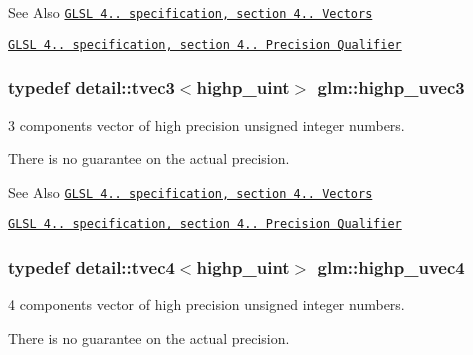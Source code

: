 \begin{DoxySeeAlso}{See Also}
\href{http://www.opengl.org/registry/doc/GLSLangSpec.4.20.8.pdf}{\tt G\-L\-S\-L 4.. specification, section 4.. Vectors} 

\href{http://www.opengl.org/registry/doc/GLSLangSpec.4.20.8.pdf}{\tt G\-L\-S\-L 4.. specification, section 4.. Precision Qualifier} 
\end{DoxySeeAlso}
\hypertarget{group__core__precision_gade4b43d968dd42ee3215a51de7b86425}{
\subsubsection[{highp\-\_\-uvec3}]{\setlength{\rightskip}{0pt plus 5cm}typedef detail\-::tvec3$<$highp\-\_\-uint$>$ {\bf glm\-::highp\-\_\-uvec3}}}\label{group__core__precision_gade4b43d968dd42ee3215a51de7b86425}


3 components vector of high precision unsigned integer numbers. 

There is no guarantee on the actual precision.

\begin{DoxySeeAlso}{See Also}
\href{http://www.opengl.org/registry/doc/GLSLangSpec.4.20.8.pdf}{\tt G\-L\-S\-L 4.. specification, section 4.. Vectors} 

\href{http://www.opengl.org/registry/doc/GLSLangSpec.4.20.8.pdf}{\tt G\-L\-S\-L 4.. specification, section 4.. Precision Qualifier} 
\end{DoxySeeAlso}
\hypertarget{group__core__precision_gadc25684638be5d1caeb63d3d5e55feec}{
\subsubsection[{highp\-\_\-uvec4}]{\setlength{\rightskip}{0pt plus 5cm}typedef detail\-::tvec4$<$highp\-\_\-uint$>$ {\bf glm\-::highp\-\_\-uvec4}}}\label{group__core__precision_gadc25684638be5d1caeb63d3d5e55feec}


4 components vector of high precision unsigned integer numbers. 

There is no guarantee on the actual precision.

